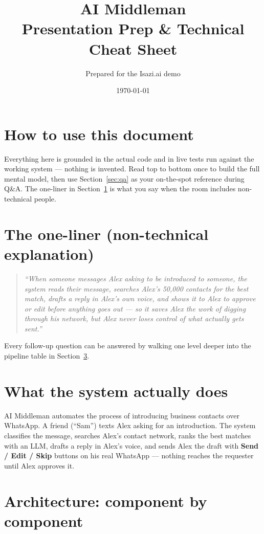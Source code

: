 \documentclass[11pt, a4paper]{article}
\title{\textbf{AI Middleman} \\ \large Presentation Prep \& Technical Cheat Sheet}
\author{Prepared for the Isazi.ai demo}
\date{\today}
\begin{document}
\maketitle
\thispagestyle{fancy}

\section*{How to use this document}
Everything here is grounded in the actual code and in live tests run against the working system --- nothing is invented. Read top to bottom once to build the full mental model, then use Section~\ref{sec:qa} as your on-the-spot reference during Q\&A. The one-liner in Section~\ref{sec:oneliner} is what you say when the room includes non-technical people.

\section{The one-liner (non-technical explanation)}
\label{sec:oneliner}

\begin{quote}
\itshape
``When someone messages Alex asking to be introduced to someone, the system reads their message, searches Alex's 50{,}000 contacts for the best match, drafts a reply in Alex's own voice, and shows it to Alex to approve or edit before anything goes out --- so it saves Alex the work of digging through his network, but Alex never loses control of what actually gets sent.''
\end{quote}

Every follow-up question can be answered by walking one level deeper into the pipeline table in Section~\ref{sec:architecture}.

\section{What the system actually does}

AI Middleman automates the process of introducing business contacts over WhatsApp. A friend (``Sam'') texts Alex asking for an introduction. The system classifies the message, searches Alex's contact network, ranks the best matches with an LLM, drafts a reply in Alex's voice, and sends Alex the draft with \textbf{Send / Edit / Skip} buttons on his real WhatsApp --- nothing reaches the requester until Alex approves it.

\section{Architecture: component by component}
\label{sec:architecture}
\end{document}
